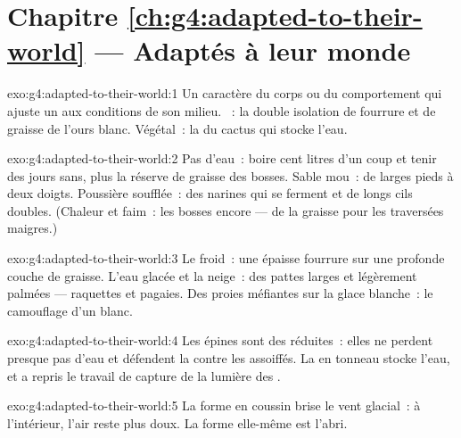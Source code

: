 \section*{Chapitre \ref{ch:g4:adapted-to-their-world} --- Adaptés à leur monde}

\begin{solution}{exo:g4:adapted-to-their-world:1}
Un caractère du corps ou du comportement qui ajuste un 
aux conditions de son milieu. ~: la double isolation de
fourrure et de graisse de l'ours blanc. Végétal~: la  du cactus
qui stocke l'eau.
\end{solution}

\begin{solution}{exo:g4:adapted-to-their-world:2}
Pas d'eau~: boire cent litres d'un coup et tenir des jours sans, plus
la réserve de graisse des bosses. Sable mou~: de larges pieds à deux
doigts. Poussière soufflée~: des narines qui se ferment et de longs
cils doubles. (Chaleur et faim~: les bosses encore --- de la graisse
pour les traversées maigres.)
\end{solution}

\begin{solution}{exo:g4:adapted-to-their-world:3}
Le froid~: une épaisse fourrure sur une profonde couche de graisse.
L'eau glacée et la neige~: des pattes larges et légèrement palmées
--- raquettes et pagaies. Des proies méfiantes sur la glace
blanche~: le camouflage d'un  blanc.
\end{solution}

\begin{solution}{exo:g4:adapted-to-their-world:4}
Les épines sont des  réduites~: elles ne perdent presque pas
d'eau et défendent la  contre les  assoiffés. La 
en tonneau stocke l'eau, et a repris le travail de capture de la
lumière des .
\end{solution}

\begin{solution}{exo:g4:adapted-to-their-world:5}
La forme en coussin brise le vent glacial~: à l'intérieur, l'air
reste plus doux. La forme elle-même est l'abri.
\end{solution}

